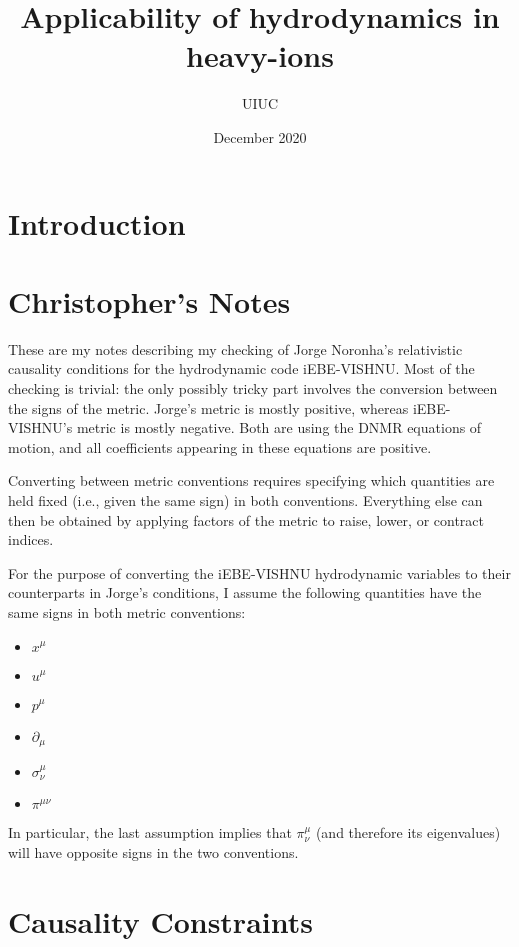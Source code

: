 \documentclass{article}
\title{Applicability of hydrodynamics in heavy-ions}
\author{UIUC}
\date{December 2020}
\begin{document}
\maketitle

\section{Introduction}


\section{Christopher's Notes}

\large

These are my notes describing my checking of Jorge Noronha's relativistic causality conditions for the hydrodynamic code iEBE-VISHNU.  Most of the checking is trivial: the only possibly tricky part involves the conversion between the signs of the metric.  Jorge's metric is mostly positive, whereas iEBE-VISHNU's metric is mostly negative.  Both are using the DNMR equations of motion, and all coefficients appearing in these equations are positive.

\medskip

Converting between metric conventions requires specifying which quantities are held fixed (i.e., given the same sign) in both conventions.  Everything else can then be obtained by applying factors of the metric to raise, lower, or contract indices.

\medskip

For the purpose of converting the iEBE-VISHNU hydrodynamic variables to their counterparts in Jorge's conditions, I assume the following quantities have the same signs in both metric conventions:
\begin{itemize}
    \item $x^\mu$
    \item $u^\mu$
    \item $p^\mu$
    \item $\partial_\mu$
    \item $\sigma^{\mu}_{\nu}$
    \item $\pi^{\mu\nu}$
\end{itemize}
In particular, the last assumption implies that $\pi^\mu_\nu$ (and therefore its eigenvalues) will have opposite signs in the two conventions.


\section{Causality Constraints}
\end{document}
